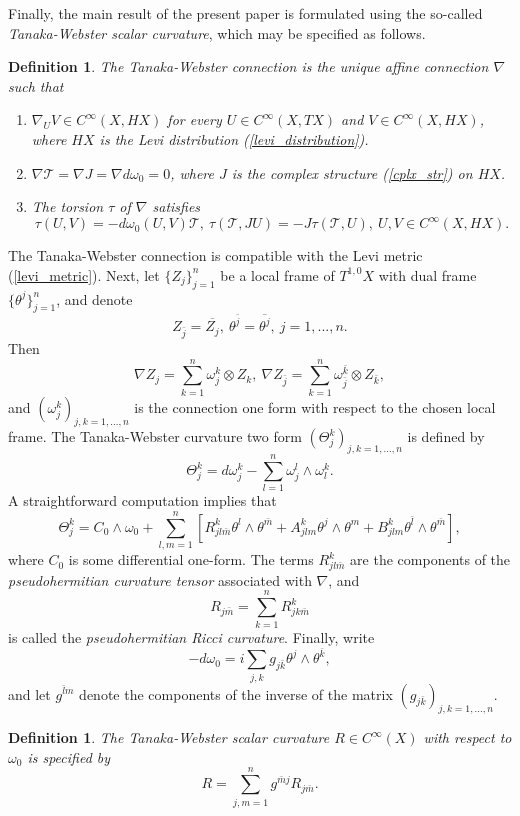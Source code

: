 \documentclass{article}
\newtheorem{definition}[theorem]{Definition}
\newcommand{\mct}{\mathcal T}
\begin{document}
Finally, the main result of the present paper is formulated using the so-called \textit{Tanaka-Webster scalar curvature}, which may be specified as follows.
%
\begin{definition}\label{tan_web_con} The Tanaka-Webster connection is the unique affine connection $\nabla$ such that
%
\begin{enumerate}
%
\item{$\nabla_U V \in C^\infty(X, HX)$ for every $U \in C^\infty(X, TX)$ and $V \in C^\infty(X, HX)$, where $HX$ is the Levi distribution (\ref{levi_distribution}).}
%
\item{$\nabla \mct = \nabla J = \nabla d\omega_0 = 0$, where $J$ is the complex structure (\ref{cplx_str}) on $HX$.}
%
\item{The torsion $\tau$ of $\nabla$ satisfies $$\tau(U,V) = -d\omega_0(U,V) \mct,\ \tau(\mct, J U) = -J \tau(\mct, U),\ U, V \in C^\infty(X, HX).$$}
%
\end{enumerate}
%
\end{definition}
%
The Tanaka-Webster connection is compatible with the Levi metric (\ref{levi_metric}). Next, let $\{Z_j\}_{j=1}^n$ be a local frame of $T^{1,0}X$ with dual frame $\{\theta^j\}_{j=1}^n$, and denote $$Z_{\bar j} = \overline{Z_j},\ \theta^{\bar j} = \overline{\theta^j},\ j=1,...,n.$$ Then $$\nabla Z_j = \sum_{k=1}^n \omega_j^k \otimes Z_k,\ \nabla Z_{\bar j} = \sum_{k = 1}^n \omega_{\bar j}^{\bar k} \otimes Z_{\bar k},$$
and $(\omega_j^k)_{j,k=1,...,n}$ is the connection one form with respect to the chosen local frame. The Tanaka-Webster curvature two form $(\Theta_j^k)_{j, k = 1,...,n}$ is defined by $$\Theta_j^k = d\omega_j^k - \sum_{l = 1}^n \omega_j^l \wedge \omega_l^k.$$
%
A straightforward computation implies that $$\Theta_j^k = C_0 \wedge \omega_0 + \sum_{l,m=1}^n\left[ R^k_{jl \bar m} \theta^l \wedge \theta^{\bar m} + A^k_{jlm} \theta^j \wedge \theta^m + B^k_{jlm} \theta^{\bar l} \wedge \theta^{\bar m}\right],$$
where $C_0$ is some differential one-form. The terms $R^k_{j l \bar m}$ are the components of the \textit{pseudohermitian curvature tensor} associated with $\nabla$, and $$R_{j \bar m} = \sum_{k = 1}^n R^k_{j k \bar m}$$
is called the \textit{pseudohermitian Ricci curvature}. Finally, write $$-d\omega_0 = i \sum_{j,k} g_{j \bar k} \theta^j \wedge \theta^{\bar k},$$
and let $g^{\bar l m}$ denote the components of the inverse of the matrix $(g_{j \bar k})_{j,k=1,...,n}$.
%
\begin{definition} The \textit{Tanaka-Webster scalar curvature} $R \in C^\infty(X)$ with respect to $\omega_0$ is specified by \begin{equation}\label{tw_curv}R = \sum_{j, m = 1}^n g^{\bar m j} R_{j \bar m}.\end{equation} \end{definition}
%
\end{document}
